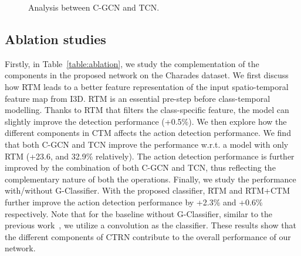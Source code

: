 \documentclass{bmvc2k}
\begin{document}
\begin{figure}[t]
\begin{floatrow}
{\caption{Analysis between C-GCN and TCN. }\label{Tab:TCN-C-GCN}
}

\end{floatrow}
\end{figure}

\subsection{Ablation studies}
Firstly, in Table~\ref{table:ablation}, we study the complementation of the components in the proposed network on the Charades dataset. 
We first discuss how RTM leads to a better feature representation of the input spatio-temporal feature map from I3D. RTM is an essential pre-step before class-temporal modelling. Thanks to RTM that filters the class-specific feature, the model can slightly improve the detection performance (+0.5\%). We then explore how the different components in CTM affects the action detection performance. We find that both C-GCN and TCN improve the performance w.r.t. a model with only RTM (+23.6, and 32.9\% relatively). The action detection performance is further improved by the combination of both C-GCN and TCN, thus reflecting the complementary nature of both the operations. Finally, we study the performance with/without G-Classifier. With the proposed classifier, RTM and RTM+CTM further improve the action detection performance by +2.3\% and +0.6\% respectively. Note that for the baseline without G-Classifier, similar to the previous work~\cite{superevent}, we utilize a  convolution as the classifier. These results show that the different components of CTRN contribute to the overall performance of our network.
\end{document}
